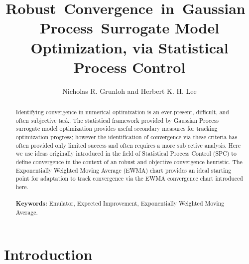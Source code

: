 \documentclass[12pt]{article}
\begin{document}
% 
%
\title{\bf{ 
	\mbox{Robust Convergence in Gaussian Process Surrogate} Model Optimization, via Statistical Process Control
}}
\author{Nicholas R. Grunloh and Herbert K. H. Lee}
\date{}
\maketitle
%
%

%
\begin{abstract}
Identifying convergence in numerical optimization is an ever-present, difficult, and often subjective task. 
The statistical framework provided by Gaussian Process surrogate model optimization provides useful secondary measures for tracking optimization progress; however the identification of convergence via these criteria has often provided only limited success and often requires a more subjective analysis. %
Here we use ideas originally introduced in the field of Statistical Process Control (SPC) to define convergence in the context of an robust and objective convergence heuristic. 
The Exponentially Weighted Moving Average (EWMA) chart provides an ideal starting point for adaptation to track convergence via the EWMA convergence chart introduced here.
\\\\
{\bf \color{red}Keywords:} Emulator, Expected Improvement, Exponentially Weighted Moving Average.
\end{abstract}
 
\doublespacing
%
%

%
%
\section{Introduction}
%
%
\end{document}
